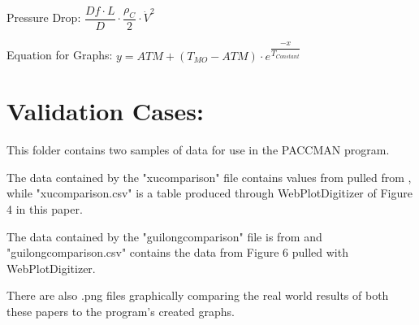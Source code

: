 \documentclass[a4paper,12pt]{article}
\begin{document}
\medskip

Pressure Drop: $\dfrac{Df \cdot L}{D} \cdot \dfrac{\rho_{C}}{2} \cdot \dot{V}^{2}$

\medskip

Equation for Graphs: $y = ATM + (T_{MO} - ATM) \cdot e^{\dfrac{-x}{T_{Constant}}}$

\clearpage

\section*{Validation Cases:}

This folder contains two samples of data for use in the PACCMAN program.

\medskip

The data contained by the "xucomparison" file contains values from pulled from \cite{XU2001}, while "xucomparison.csv" is a table produced through WebPlotDigitizer of Figure 4 in this  paper.

\medskip

The data contained by the "guilongcomparison" file is from \cite{GUILONG2010} and "guilongcomparison.csv" contains the data from Figure 6 pulled with WebPlotDigitizer. 

\medskip

There are also .png files graphically comparing the real world results of both these papers to the program's created graphs.

\clearpage

\nocite{*} 

\end{document}
